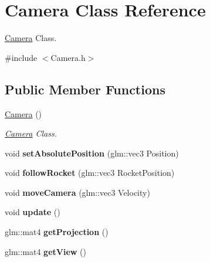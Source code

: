 \hypertarget{class_camera}{\section{Camera Class Reference}
\label{class_camera}
}


\hyperlink{class_camera}{Camera} Class.  




{\ttfamily \#include $<$Camera.\+h$>$}

\subsection*{Public Member Functions}
\begin{DoxyCompactItemize}
\item 
\hyperlink{class_camera_a01f94c3543f56ede7af49dc778f19331}{Camera} ()
\begin{DoxyCompactList}\small\item\em \hyperlink{class_camera}{Camera} Class. \end{DoxyCompactList}\item 
\hypertarget{class_camera_a0fd4608544e6cf4a8c0462ac70f94824}{void {\bfseries set\+Absolute\+Position} (glm\+::vec3 Position)}\label{class_camera_a0fd4608544e6cf4a8c0462ac70f94824}

\item 
\hypertarget{class_camera_aa632c0104c03e5ca0eeccd9982e8cf72}{void {\bfseries follow\+Rocket} (glm\+::vec3 Rocket\+Position)}\label{class_camera_aa632c0104c03e5ca0eeccd9982e8cf72}

\item 
\hypertarget{class_camera_a7521debfeea7c519cff1bab2cf4a4426}{void {\bfseries move\+Camera} (glm\+::vec3 Velocity)}\label{class_camera_a7521debfeea7c519cff1bab2cf4a4426}

\item 
\hypertarget{class_camera_a42cda7239981a5618660d04bd5893556}{void {\bfseries update} ()}\label{class_camera_a42cda7239981a5618660d04bd5893556}

\item 
\hypertarget{class_camera_ad97a8d5eab9961181e7d96315f5938c6}{glm\+::mat4 {\bfseries get\+Projection} ()}\label{class_camera_ad97a8d5eab9961181e7d96315f5938c6}

\item 
\hypertarget{class_camera_a9fd979b84ae4959a77a85090976137db}{glm\+::mat4 {\bfseries get\+View} ()}\label{class_camera_a9fd979b84ae4959a77a85090976137db}

\end{DoxyCompactItemize}


